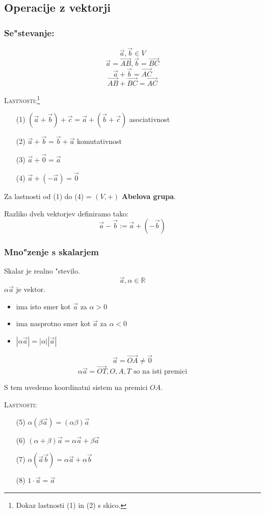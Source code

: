 \subsection{Operacije z vektorji}
\subsubsection*{Se"stevanje:}
\[\vec{a}, \vec{b} \in V\]
\[\vec{a} = \vec{AB}, \vec{b} = \vec{BC}\]
\[\vec{a} + \vec{b} = \vec{AC}\]
\[\vec{AB} + \vec{BC} = \vec{AC}\]

\textsc{Lastnosti:}\footnote{Dokaz lastnosti (1) in (2) s skico.}
\begin{itemize}
	\item[(1)] \((\vec{a} + \vec{b}) + \vec{c} = \vec{a} + (\vec{b} + \vec{c})\) asociativnost
	\item[(2)] \(\vec{a} + \vec{b} = \vec{b} + \vec{a}\) komutativnost
	\item[(3)] \(\vec{a} + \vec{0} = \vec{a}\)
	\item[(4)] \(\vec{a} + (-\vec{a}) = \vec{0}\)
\end{itemize}

Za lastnosti od (1) do (4) = \((V, +)\) \textbf{Abelova grupa}.

Razliko dveh vektorjev definiramo tako:
\[\vec{a} - \vec{b} := \vec{a} + (-\vec{b})\]

\subsubsection*{Mno"zenje s skalarjem}
Skalar je realno "stevilo.
\[\vec{a}, \alpha \in \mathbb{R}\]
\(\alpha \vec{a}\) je vektor.
\begin{itemize}
	\item ima isto smer kot \(\vec{a}\) za \(\alpha > 0\)
	\item ima nasprotno smer kot \(\vec{a}\) za \(\alpha < 0\)
	\item \(|\alpha \vec{a}| = |\alpha| |\vec{a}|\)
\end{itemize}

\[\vec{a} = \vec{OA} \neq \vec{0}\]
\[\alpha \vec{a} = \vec{OT}, O, A, T \text{ so na isti premici} \]

S tem uvedemo koordinatni sistem na premici \(OA\).

\textsc{Lastnosti:}
\begin{itemize}
	\item[(5)] \(\alpha (\beta \vec{a}) = (\alpha \beta) \vec{a}\)
	\item[(6)] \((\alpha + \beta) \vec{a} = \alpha \vec{a} + \beta \vec{a} \)
	\item[(7)] \(\alpha(\vec{a} \vec{b}) = \alpha \vec{a} + \alpha \vec{b}\)
	\item[(8)] \(1\cdot \vec{a} = \vec{a}\)
\end{itemize}

